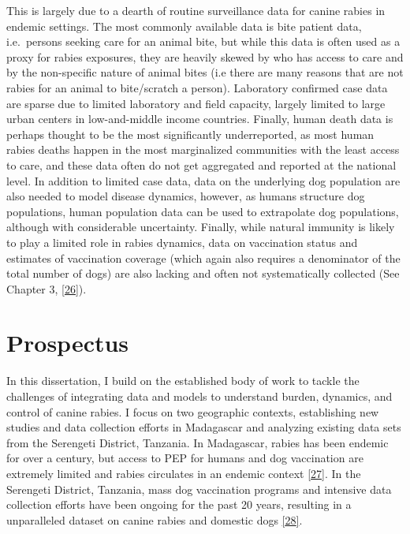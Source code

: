 \documentclass[
  oneside]{book}
\begin{document}
This is largely due to a dearth of routine surveillance data for canine rabies in endemic settings. The most commonly available data is bite patient data, i.e.~persons seeking care for an animal bite, but while this data is often used as a proxy for rabies exposures, they are heavily skewed by who has access to care and by the non-specific nature of animal bites (i.e there are many reasons that are not rabies for an animal to bite/scratch a person). Laboratory confirmed case data are sparse due to limited laboratory and field capacity, largely limited to large urban centers in low-and-middle income countries. Finally, human death data is perhaps thought to be the most significantly underreported, as most human rabies deaths happen in the most marginalized communities with the least access to care, and these data often do not get aggregated and reported at the national level. In addition to limited case data, data on the underlying dog population are also needed to model disease dynamics, however, as humans structure dog populations, human population data can be used to extrapolate dog populations, although with considerable uncertainty. Finally, while natural immunity is likely to play a limited role in rabies dynamics, data on vaccination status and estimates of vaccination coverage (which again also requires a denominator of the total number of dogs) are also lacking and often not systematically collected (See Chapter 3, \protect\hyperlink{ref-rajeev2020modeling}{{[}26{]}}).

\hypertarget{prospectus}{%
\section{Prospectus}\label{prospectus}}

In this dissertation, I build on the established body of work to tackle the challenges of integrating data and models to understand burden, dynamics, and control of canine rabies. I focus on two geographic contexts, establishing new studies and data collection efforts in Madagascar and analyzing existing data sets from the Serengeti District, Tanzania. In Madagascar, rabies has been endemic for over a century, but access to PEP for humans and dog vaccination are extremely limited and rabies circulates in an endemic context \protect\hyperlink{ref-andriamandimby2013}{{[}27{]}}. In the Serengeti District, Tanzania, mass dog vaccination programs and intensive data collection efforts have been ongoing for the past 20 years, resulting in a unparalleled dataset on canine rabies and domestic dogs \protect\hyperlink{ref-Mancyinprep}{{[}28{]}}.
\end{document}

